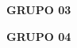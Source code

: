 \begin{center}

{\large \textbf {GRUPO 03}}
\par
\vspace{12pt}
{\normalsize \alunoA}
\par
{\normalsize \alunoB}
\par
{\normalsize \alunoC}
\par
{\normalsize \alunoD}
\par
{\normalsize \alunoE}
\par
{\normalsize \alunoF}
\par
\vspace{12pt}

{\large \textbf {GRUPO 04}}
\par
\vspace{12pt}
{\normalsize \alunoG}
\par
{\normalsize \alunoH}
\par

\end{center}
\clearpage



\renewcommand{\contentsname}{Conteúdo}
{
	\hypersetup{linkcolor=black}
	\tableofcontents
}
